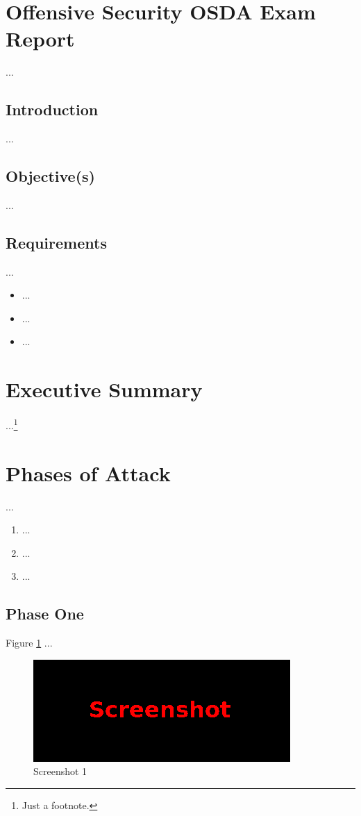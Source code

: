 %
%
%
\section{Offensive Security OSDA Exam Report}\label{osda-sec:sec1}
%
...
%
%
%
\subsection{Introduction}\label{osda-sec:sec1-intro}
%
...~\cite{MitreAttack}
%
%
%
\subsection{Objective(s)}\label{osda-sec:sec1-obj}
%
...
%
%
%
\subsection{Requirements}\label{osda-sec:sec1-req}
%
...

\begin{itemize}
    \item ...
    \item ...
    \item ...
\end{itemize}
%
%
%
\section{Executive Summary}\label{osda-sec:sec2}
%
...\footnote{Just a footnote.}
%
%
%
\section{Phases of Attack}\label{osda-sec:sec3}
%
...

\begin{enumerate}
    \item ...
    \item ...
    \item ...
\end{enumerate}
%
%
%
\subsection{Phase One}\label{osda-sec:sec3-phase1}
%
Figure \ref{osda-fig:sec3-phase1-screen1} ...

\begin{figure}[H]
    \centering
    \includegraphics[width=\textwidth]{img/assignment1/screen1.png}
    \caption{Screenshot 1}\label{osda-fig:sec3-phase1-screen1}
\end{figure}
%
%
%
